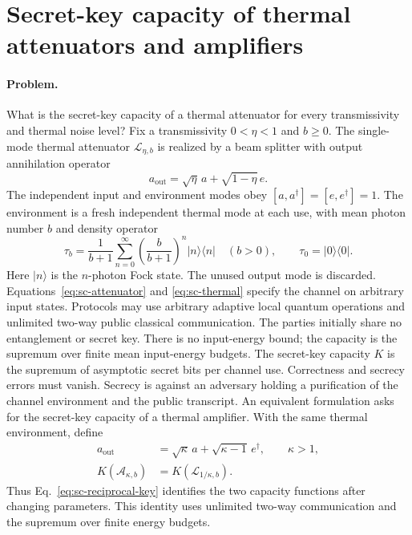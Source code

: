 \section{Secret-key capacity of thermal attenuators and amplifiers}
\label{sec:op_2e91f2de9c41103f}

\paragraph{Problem.}
What is the secret-key capacity of a thermal attenuator for every transmissivity and thermal noise level?
Fix a transmissivity $0<\eta<1$ and $b\geq0$. The single-mode thermal attenuator $\mathcal L_{\eta,b}$ is realized by a beam splitter with output annihilation operator
\begin{equation}
 a_{\mathrm{out}}=\sqrt\eta\,a+\sqrt{1-\eta}\,e.
 \label{eq:sc-attenuator}
\end{equation}
The independent input and environment modes obey $[a,a^\dagger]=[e,e^\dagger]=1$. The environment is a fresh independent thermal mode at each use, with mean photon number $b$ and density operator
\begin{equation}
 \tau_b=\frac1{b+1}\sum_{n=0}^{\infty}\left(\frac b{b+1}\right)^n|n\rangle\langle n|\quad(b>0),\qquad \tau_0=|0\rangle\langle0|.
 \label{eq:sc-thermal}
\end{equation}
Here $|n\rangle$ is the $n$-photon Fock state. The unused output mode is discarded.
Equations~\eqref{eq:sc-attenuator} and \eqref{eq:sc-thermal} specify the channel on arbitrary input states.
Protocols may use arbitrary adaptive local quantum operations and unlimited two-way public classical communication. The parties initially share no entanglement or secret key. There is no input-energy bound; the capacity is the supremum over finite mean input-energy budgets.
The secret-key capacity $K$ is the supremum of asymptotic secret bits per channel use. Correctness and secrecy errors must vanish. Secrecy is against an adversary holding a purification of the channel environment and the public transcript.
An equivalent formulation asks for the secret-key capacity of a thermal amplifier. With the same thermal environment, define
\begin{equation}
\begin{aligned}
 a_{\mathrm{out}}&=\sqrt\kappa\,a+\sqrt{\kappa-1}\,e^\dagger,
 \qquad \kappa>1,\\
 K(\mathcal A_{\kappa,b})&=K(\mathcal L_{1/\kappa,b}).
\end{aligned}
\label{eq:sc-reciprocal-key}
\end{equation}
Thus Eq.~\eqref{eq:sc-reciprocal-key} identifies the two capacity functions after changing parameters. This identity uses unlimited two-way communication and the supremum over finite energy budgets.

